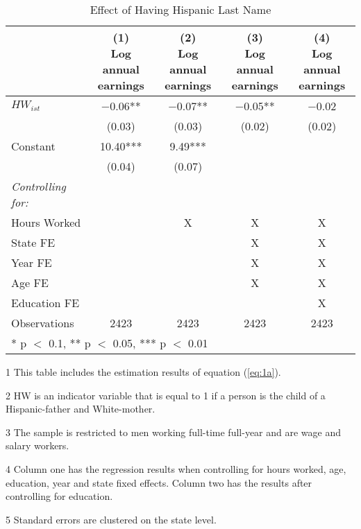 \begin{table}[H]

\caption{Effect of Having Hispanic Last Name \label{tab:lastnamereg}}
\centering
\begin{threeparttable}
\begin{tabular}[t]{lcccc}
\toprule
  & \specialcell{(1) \\ Log annual \\ earnings} & \specialcell{(2) \\ Log annual \\ earnings} & \specialcell{(3) \\ Log annual \\ earnings} & \specialcell{(4) \\  Log annual \\ earnings}\\
\midrule
$HW_{ist}$ & \num{-0.06}** & \num{-0.07}** & \num{-0.05}** & \num{-0.02}\\
 & (\num{0.03}) & (\num{0.03}) & (\num{0.02}) & (\num{0.02})\\
Constant & \num{10.40}*** & \num{9.49}*** &  & \\
 & (\num{0.04}) & (\num{0.07}) &  & \\
\midrule
\textit{Controlling for:} &  &  &  & \\
Hours Worked &  & X & X & X\\
State FE &  &  & X & X\\
Year FE &  &  & X & X\\
Age FE &  &  & X & X\\
Education FE &  &  &  & X\\
Observations & \num{2423} & \num{2423} & \num{2423} & \num{2423}\\
\bottomrule
\multicolumn{5}{l}{\rule{0pt}{1em}* p $<$ 0.1, ** p $<$ 0.05, *** p $<$ 0.01}\\
\end{tabular}
\begin{tablenotes}
\item[1] {\footnotesize{This table includes the estimation results of equation (\ref{eq:1a}).}}
\item[2] {\footnotesize{HW is an indicator variable that is equal to 1 if a person is the child of a Hispanic-father and White-mother.}}
\item[3] {\footnotesize{The sample is restricted to men working full-time full-year and are wage and salary workers.}}
\item[4] {\footnotesize{Column one has the regression results when controlling for hours worked, age, education, year and state fixed effects. Column two has the results after controlling for education.}}
\item[5] {\footnotesize{Standard errors are clustered on the state level.}}
\end{tablenotes}
\end{threeparttable}
\end{table}
